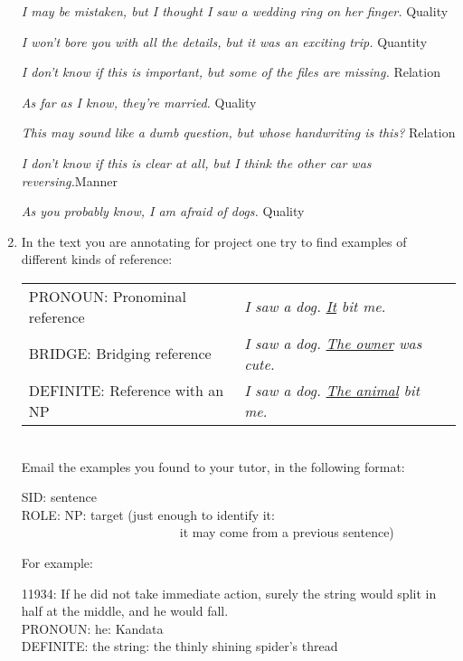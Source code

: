 \documentclass[a4paper]{article}
\newcommand{\ul}[1]{\uline{#1}}
\begin{document}
\begin{enumerate}
\begin{exe}
\ex \textit{I may be mistaken, but I thought I saw a wedding ring on her finger.}
\hfill Quality


\ex \textit{I won't bore you with all the details, but it was an exciting trip.}
\hfill Quantity

\ex \textit{I don't know if this is important, but some of the files are missing.}
\hfill Relation

\ex \textit{As far as I know, they're married.}
\hfill Quality


\ex \textit{This may sound like a dumb question, but whose handwriting is this?}
\hfill Relation

\ex \textit{I don't know if this is clear at all, but I think the other car was reversing.}\hfill Manner

\ex \textit{As you probably know, I am afraid of dogs.}
\hfill Quality
\end{exe}

\item In the text you are
  annotating for project one try to find  examples of different kinds of reference:\\[2ex]
  \begin{tabular}{lll}
    PRONOUN: Pronominal reference & \textit{I saw a dog. \ul{It} bit me.} \\
    BRIDGE:  Bridging reference & \textit{I saw a dog.  \ul{The owner} was cute.} \\
    DEFINITE: Reference with an NP & \textit{I saw a dog. \ul{The animal} bit me.} \\
  \end{tabular} \\[2ex]
  Email the examples you found to your tutor, 
  in the following format:\\
   \begin{flushleft}
    SID: sentence \\
    ROLE: NP: target (just enough to identify it: \\
~~~~~~~~~~~~~~~~~~~~~~~~~it may come from a previous sentence)
  \end{flushleft}


\bigskip

   For example:
 
  \begin{flushleft}
    11934: If he did not take immediate action, surely the string would split in half at the middle, and he would fall.\\ 
    PRONOUN: he: Kandata \\
    DEFINITE: the string: the thinly shining spider's thread
  \end{flushleft}

\end{enumerate}
\end{document}
